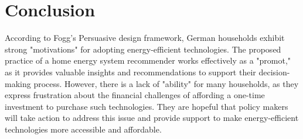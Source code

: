\chapter{Conclusion}

According to Fogg's Persuasive design framework, 
German households exhibit strong "motivations" for adopting energy-efficient technologies. 
The proposed practice of a home energy system recommender works effectively as a "promot," as it provides valuable insights and recommendations to support their decision-making process. 
However, there is a lack of "ability" for many households, 
as they express frustration about the financial challenges of affording a one-time investment to purchase such technologies. 
They are hopeful that policy makers will take action to address this issue and provide support to make energy-efficient technologies more accessible and affordable.